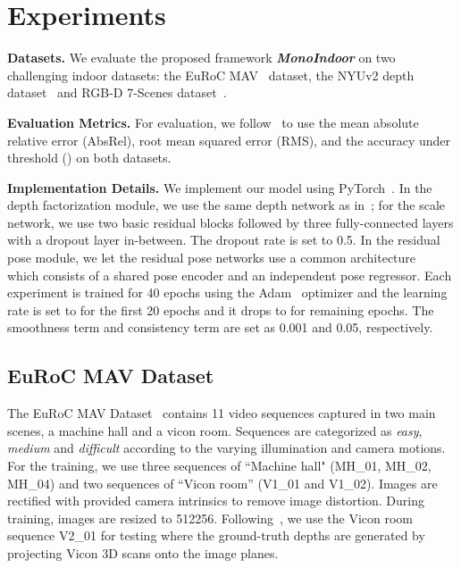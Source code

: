 \section{Experiments}

\noindent\textbf{Datasets.} We evaluate the proposed framework \textbf{\textit{MonoIndoor}} on two challenging indoor datasets: the EuRoC MAV~\cite{schonberger2016structure} dataset, the NYUv2 depth dataset~\cite{Silberman:ECCV12} and RGB-D 7-Scenes dataset~\cite{Shotton_2013_CVPR}. 

\noindent\textbf{Evaluation Metrics.} For evaluation, we follow~\cite{eigen2014depth} to use the mean absolute relative error (AbsRel), root mean squared error (RMS), and the accuracy under threshold () on both datasets.

\noindent\textbf{Implementation Details.} We implement our model using PyTorch~\cite{NEURIPS2019_9015}. In the depth factorization module, we use the same depth network as in~\cite{godard2019digging}; for the scale network, we use two basic residual blocks followed by three fully-connected layers with a dropout layer in-between. The dropout rate is set to 0.5. In the residual pose module, we let the residual pose networks use a common architecture~\cite{godard2019digging} which consists of a shared pose encoder and an independent pose regressor.  Each experiment is trained for 40 epochs using the Adam~\cite{kingma2015adam} optimizer and the learning rate is set to  for the first 20 epochs and it drops to  for remaining epochs. The smoothness term  and consistency term  are set as 0.001 and 0.05, respectively.

\subsection{EuRoC MAV Dataset}
The EuRoC MAV Dataset~\cite{schonberger2016structure} contains 11 video sequences captured in two main scenes, a machine hall and a vicon room. Sequences are categorized as \textit{easy}, \textit{medium} and \textit{difficult} according to the varying illumination and camera motions.
For the training, we use three sequences of ``Machine hall" (MH\_01, MH\_02, MH\_04) and two sequences of ``Vicon room'' (V1\_01 and V1\_02). Images are rectified with provided camera intrinsics to remove image distortion. During training, images are resized to 512256. Following~\cite{gordon2019depth}, we use the Vicon room sequence V2\_01 for testing where the ground-truth depths are generated by projecting Vicon 3D scans onto the image planes.

